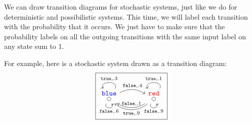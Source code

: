 \documentclass[DynamicalBook]{subfiles}
\begin{document}
\begin{example}
We can draw transition diagrams for stochastic systems, just like we do for
deterministic and possibilistic systems. This time, we will label each
transition with the probability that it occurs. We just have to make sure that the probability labels on
all the outgoing transitions with the same input label on any state sum to 1.

For example, here is a stochastic system drawn as a transition diagram:
\begin{equation}\label{eqn.transition_stochastic}  
  \begin{tikzpicture}[baseline=(bl)]
	\node[draw] (bl) {
  \begin{tikzcd}[sep=large]
    \LMO{\Blue} \ar[loop, looseness=2, out=60, in=120, "{\true, .3}"'] \ar[loop, looseness=3, out=240, in=300, "{\false, .6}"'] \ar[r, bend left = 30, "{\false, .4}"] \ar[r, bend right =30, leftarrow, "{\false, .1}"] \ar[r, leftarrow, bend right = 40, "{\true, .9}"']& \LMO{\Red} \ar[loop, looseness=2, out=60, in=120, "{\true, .1}"'] \ar[loop, looseness=3, out=240, in=300, "{\false, .9}"']
  \end{tikzcd}};
\end{tikzpicture}
\end{equation}

\end{example}
\end{document}
